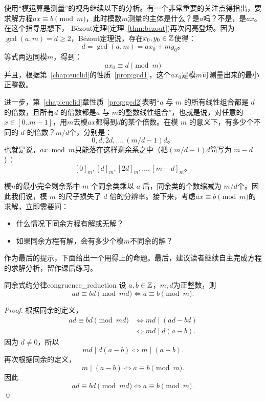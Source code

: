 使用“模运算是测量”的视角继续以下的分析。有一个非常重要的关注点得指出，要求解方程$a x \equiv b \pmod{m}$，此时模数$m$测量的主体是什么？是$a$吗？不是，是$ax$。在这个指导思想下，
B\'{e}zout定理(定理~\ref{thm:bezout})再次闪亮登场。因为$\gcd(a,m) = d \ge 2$，B\'{e}zout定理说，存在$x_0, y_0\in {\mathbb Z}$使得：
	\[d = \gcd(a, m) = ax_0 + my_0\text{。}\]
等式两边同模$m$，得到：
\[ ax_0 \equiv d \pmod m \] 
并且，根据第~\ref{chap:euclid}的性质~\ref{prop:gcd1}，这个$a x_0$是模$m$可测量出来的最小正整数。

进一步，第~\ref{chap:euclid}章性质~\ref{prop:gcd2}表明“$a$ 与 $m$ 的所有线性组合都是 $d$ 的倍数，且所有$d$ 的倍数都是$a$ 与 $m$的整数线性组合”，也就是说，对任意的$x \in [0..m-1]$，用$m$去模$a x$都得到$d$的某个倍数。在模 $m$ 的意义下，有多少个不同的 $d$ 的倍数？$m/d$个，分别是：
\[ 0, d, 2d, \ldots, (m/d - 1) d \text{。}\]
也就是说，$a x \bmod m$只能落在这样剩余系之中（把$(m/d - 1) d $简写为 $m - d$ ）：
\[ [0]_m, [d]_m, [2d]_m, \ldots, [m-d]_m \text{。}\]

模$n$的最小完全剩余系中 $m$ 个同余类乘以 $a$ 后，同余类的个数缩减为 $m/d$个。因此我们说，模 $m$ 的尺子损失了 $d$ 倍的分辨率。接下来，考虑$a x \equiv b \pmod{m}$的求解，立即需要问：
\begin{thinking}
\label{thk:cong_eq}
\begin{itemize}
\item 什么情况下同余方程有解或无解？

\item 如果同余方程有解，会有多少个模$m$不同余的解？
\end{itemize}
\end{thinking}

作为最后的提示，下面给出一个用得上的命题。最后，建议读者继续自主完成方程的求解分析，留作课后练习。

\begin{proposition}{同余式约分律}{congruence_reduction}
设 $a,b\in{\mathbb Z}$，$m,d$为正整数，则
\[
	ad\equiv bd\pmod{md}
	\iff
	a\equiv b\pmod m.
\]
\end{proposition}

\begin{proof}
根据同余的定义，
\[
\begin{aligned}
ad\equiv bd\pmod{md}
&\iff md\mid(ad-bd)\\
&\iff md\mid d(a-b).
\end{aligned}
\]
因为 $d\neq0$，所以
\[
md\mid d(a-b)
\iff
m\mid(a-b).
\]
再次根据同余的定义，
\[
m\mid(a-b)
\iff
a\equiv b\pmod m.
\]
因此
\[
ad\equiv bd\pmod{md}
\iff
a\equiv b\pmod m.
\]
\qed
\end{proof}


